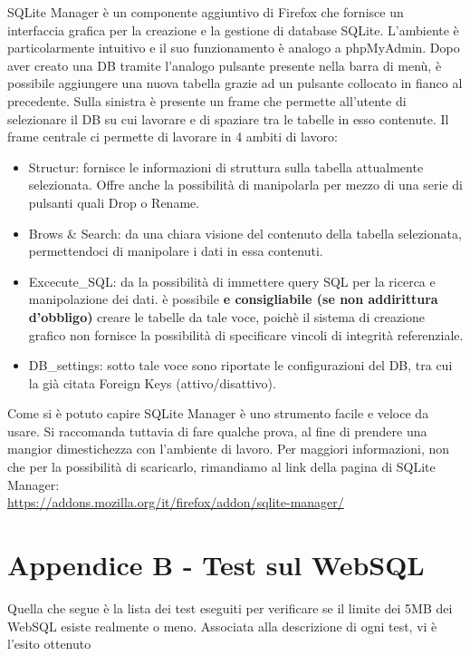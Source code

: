 \documentclass[10pt,a4paper,onecolumn]{article}
\begin{document}
SQLite Manager è un componente aggiuntivo di Firefox che fornisce un interfaccia grafica per la creazione e la gestione di database SQLite. L'ambiente è particolarmente intuitivo e il suo funzionamento è analogo a phpMyAdmin. Dopo aver creato una DB tramite l'analogo pulsante presente nella barra di menù, è possibile aggiungere una nuova tabella grazie ad un pulsante collocato in fianco al precedente. Sulla sinistra è presente un frame che permette all'utente di selezionare il DB su cui lavorare e di spaziare tra le tabelle in esso contenute. Il frame centrale ci permette di lavorare in 4 ambiti di lavoro:
\begin{itemize}
	\item Structur: fornisce le informazioni di struttura sulla tabella attualmente selezionata. Offre anche la possibilità di manipolarla per mezzo di una serie di pulsanti quali Drop o Rename.
	\item Brows \& Search: da una chiara visione del contenuto della tabella selezionata, permettendoci di manipolare i dati in essa contenuti.
	\item Excecute\_SQL: da la possibilità di immettere query SQL per la ricerca e manipolazione dei dati. è possibile {\bfseries e consigliabile (se non addirittura d'obbligo)} creare le tabelle da tale voce, poichè il sistema di creazione grafico non fornisce la possibilità di specificare vincoli di integrità referenziale.
	\item DB\_settings: sotto tale voce sono riportate le configurazioni del DB, tra cui la già citata Foreign Keys (attivo/disattivo).
\end{itemize}
Come si è potuto capire SQLite Manager è uno strumento facile e veloce da usare. Si raccomanda tuttavia di fare qualche prova, al fine di prendere una mangior dimestichezza con l'ambiente di lavoro.
Per maggiori informazioni, non che per la possibilità di scaricarlo, rimandiamo al link della pagina di SQLite Manager:\\
\url{https://addons.mozilla.org/it/firefox/addon/sqlite-manager/}

\clearpage

\section{Appendice B - Test sul WebSQL}

Quella che segue è la lista dei test eseguiti per verificare se il limite dei 5MB dei WebSQL esiste realmente o meno. Associata alla descrizione di ogni test, vi è l'esito ottenuto
\end{document}
